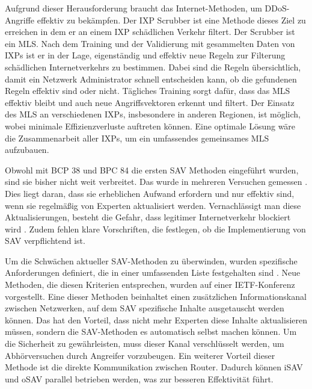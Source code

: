 \documentclass[sigplan,screen]{acmart}
\begin{document}
Aufgrund dieser Herausforderung braucht das Internet-Methoden, um DDoS-Angriffe effektiv zu bekämpfen. Der IXP Scrubber \cite{Hohlfeld01} ist eine Methode dieses Ziel zu erreichen in dem er an einem IXP schädlichen Verkehr filtert. Der Scrubber ist ein MLS. Nach dem Training und der Validierung mit gesammelten Daten von IXPs ist er in der Lage, eigenständig und effektiv neue Regeln zur Filterung schädlichen Internetverkehrs zu bestimmen. Dabei sind die Regeln übersichtlich, damit ein Netzwerk Administrator schnell entscheiden kann, ob die gefundenen Regeln effektiv sind oder nicht. Tägliches Training sorgt dafür, dass das MLS effektiv bleibt und auch neue Angriffsvektoren erkennt und filtert. Der Einsatz des MLS an verschiedenen IXPs, insbesondere in anderen Regionen, ist möglich, wobei minimale Effizienzverluste auftreten können. Eine optimale Lösung wäre die Zusammenarbeit aller IXPs, um ein umfassendes gemeinsames MLS aufzubauen.

Obwohl mit BCP 38 und BPC 84 die ersten SAV Methoden eingeführt wurden, sind sie bisher nicht weit verbreitet. Das wurde in mehreren Versuchen gemessen \cite{Spoofer01} \cite{CRP01} \cite{largemeasurment01}. Dies liegt daran, dass sie erheblichen Aufwand erfordern und nur effektiv sind, wenn sie regelmäßig von Experten aktualisiert werden. Vernachlässigt man diese Aktualisierungen, besteht die Gefahr, dass legitimer Internetverkehr blockiert wird \cite{SAV_requirements01}. Zudem fehlen klare Vorschriften, die festlegen, ob die Implementierung von SAV verpflichtend ist.

Um die Schwächen aktueller SAV-Methoden zu überwinden, wurden spezifische Anforderungen definiert, die in einer umfassenden Liste festgehalten sind \cite{SAV_requirements01}. Neue Methoden, die diesen Kriterien entsprechen, wurden auf einer IETF-Konferenz vorgestellt. Eine dieser Methoden beinhaltet einen zusätzlichen Informationskanal zwischen Netzwerken, auf dem SAV spezifische Inhalte ausgetauscht werden können. Das hat den Vorteil, dass nicht mehr Experten diese Inhalte aktualisieren müssen, sondern die SAV-Methoden es automatisch selbst machen können. Um die Sicherheit zu gewährleisten, muss dieser Kanal verschlüsselt werden, um Abhörversuchen durch Angreifer vorzubeugen. Ein weiterer Vorteil dieser Methode ist die direkte Kommunikation zwischen Router. Dadurch können iSAV und oSAV parallel betrieben werden, was zur besseren Effektivität führt.
\end{document}
